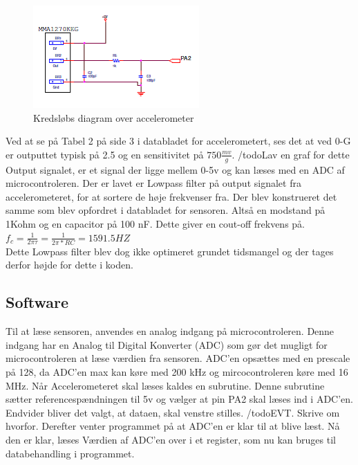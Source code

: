 \begin{figure}
\includegraphics[scale=0.8]{./Graphics/Accelerometer_diagram}
\caption{Kredsløbs diagram over accelerometer}
\label{diagram_acc}
\end{figure}

Ved at se på Tabel 2 på side 3 i databladet for accelerometert, ses det at ved 0-G er outputtet typisk på 2.5  og en sensitivitet på $750\frac{mv}{g}$. /todo{Lav en graf for dette}
Output signalet, er et signal der ligge mellem 0-5v og kan læses med en ADC af microcontroleren.
Der er lavet er Lowpass filter på output signalet fra accelerometeret, for at sortere de høje frekvenser fra. Der blev konstrueret det samme som blev opfordret i databladet for sensoren. Altså en modstand på 1Kohm og en capacitor på 100 nF. Dette giver en cout-off frekvens på.\\$f_{c}=\frac{1}{2\pi\tau}=\frac{1}{2\pi*RC}=1591.5 HZ$\\

Dette Lowpass filter blev dog ikke optimeret grundet tidsmangel og der tages derfor højde for dette i koden.\\

\subsection{Software}
Til at læse sensoren, anvendes en analog indgang på microcontroleren. Denne indgang har en Analog til Digital Konverter (ADC) som gør det mugligt for microcontroleren at læse værdien fra sensoren. ADC'en opsættes med en prescale på 128, da ADC'en max kan køre med 200 kHz og mircocontroleren køre med 16 MHz. 
Når Accelerometeret skal læses kaldes en subrutine. Denne subrutine sætter referencespændningen til 5v og vælger at pin PA2 skal læses ind i ADC'en. Endvider bliver det valgt, at dataen, skal venstre stilles. /todo{EVT. Skrive om hvorfor}. Derefter venter programmet på at ADC'en er klar til at blive læst. Nå den er klar, læses Værdien af ADC'en over i et register, som nu kan bruges til databehandling i programmet.\\

